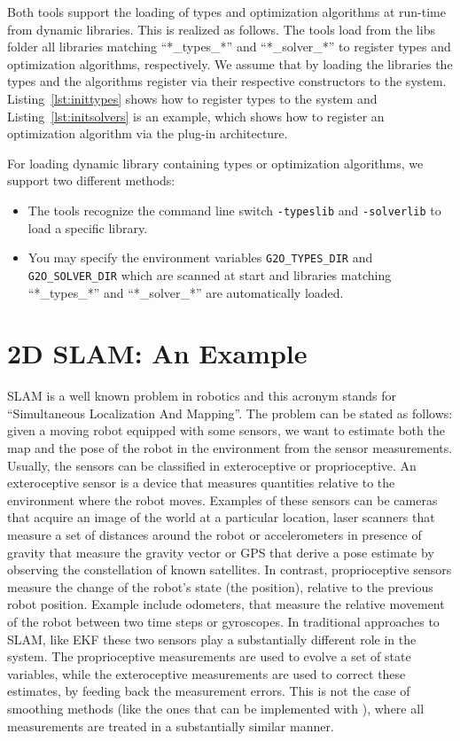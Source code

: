 \documentclass[a4paper]{article}
\begin{document}
Both tools support the loading of types and optimization algorithms at
run-time from dynamic libraries. This is realized as follows. The tools
load from the libs folder all libraries matching ``*\_types\_*'' and
``*\_solver\_*'' to register types and optimization algorithms,
respectively. We assume that by loading the libraries the types and the
algorithms register via their respective constructors to the system.
Listing~\ref{lst:inittypes} shows how to register types to the system
and Listing~\ref{lst:initsolvers} is an example, which shows how to
register an optimization algorithm via the plug-in architecture.

For loading dynamic library containing types or optimization algorithms, we support two
different methods:
\begin{itemize}
  \item The tools recognize the command line switch \verb+-typeslib+
    and \verb+-solverlib+ to load a specific library.
  \item You may specify the environment variables \verb+G2O_TYPES_DIR+
    and \verb+G2O_SOLVER_DIR+ which are scanned at start and libraries
    matching ``*\_types\_*'' and ``*\_solver\_*'' are automatically
    loaded.
\end{itemize}

\section{2D SLAM: An Example}
SLAM is a well known problem in robotics and this acronym stands for
``Simultaneous Localization And Mapping''. The problem can be stated
as follows: given a moving robot equipped with some sensors, we want
to estimate both the map and the pose of the robot in the environment
from the sensor measurements. Usually, the sensors can be classified
in exteroceptive or proprioceptive.  An exteroceptive sensor is a
device that measures quantities relative to the environment where the
robot moves.  Examples of these sensors can be cameras that acquire an
image of the world at a particular location, laser scanners that
measure a set of distances around the robot or accelerometers in
presence of gravity that measure the gravity vector or GPS that derive
a pose estimate by observing the constellation of known satellites.
In contrast, proprioceptive sensors measure the change of the robot's
state (the position), relative to the previous robot position. Example
include odometers, that measure the relative movement of the robot
between two time steps or gyroscopes. In traditional approaches to
SLAM, like EKF these two sensors play a substantially different role
in the system.  The proprioceptive measurements are used to evolve a
set of state variables, while the exteroceptive measurements are used
to correct these estimates, by feeding back the measurement errors.
This is not the case of smoothing methods (like the ones that can be
implemented with \gopt{}), where all measurements are treated in a
substantially similar manner.
\end{document}
